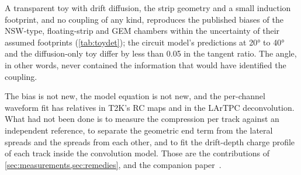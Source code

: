 A transparent toy with drift diffusion, the strip geometry and a small induction footprint, and no coupling of any kind,
reproduces the published biases of the NSW-type, floating-strip and GEM chambers within the uncertainty of their assumed
footprints (\cref{tab:toydet}); the circuit model's predictions at \ang{20} to \ang{40} and the diffusion-only toy differ by
less than 0.05 in the tangent ratio. The angle, in other words, never contained the information that would have identified
the coupling.

The bias is not new, the model equation is not new, and the per-channel waveform fit has relatives in T2K's RC maps and in the
LArTPC deconvolution. What had not been done is to measure the compression per track against an independent reference, to
separate the geometric end term from the lateral spreads and the spreads from each other, and to fit the drift-depth charge
profile of each track inside the convolution model. Those are the contributions of \cref{sec:measurements,sec:remedies}, and the
companion paper~\cite{paperII}.
